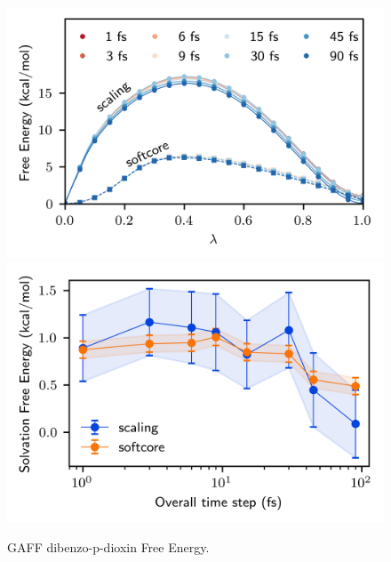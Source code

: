\documentclass[
aip,
jcp,
reprint,
]{revtex4-1}
\begin{document}
\begin{figure}
	\centering
	\includegraphics{gaff_dibenzo-p-dioxin_vdw_free_energy_profiles}
	\includegraphics{gaff_dibenzo-p-dioxin_vdw_free_energies}
	\caption{GAFF dibenzo-p-dioxin Free Energy.}
	\label{fig:dibenzo-p-dioxin vdw free energy}
\end{figure}
\end{document}
